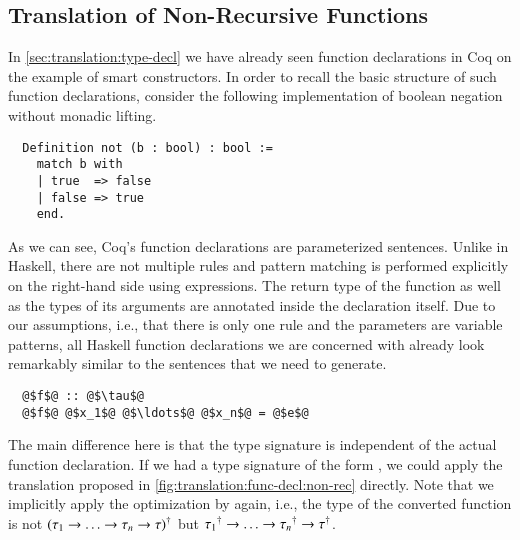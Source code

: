 \subsection{Translation of Non-Recursive Functions}
In \autoref{sec:translation:type-decl} we have already seen function declarations in Coq on the example of smart constructors.
In order to recall the basic structure of such function declarations, consider the following implementation of boolean negation without monadic lifting.
\begin{verbatim}
  Definition not (b : bool) : bool :=
    match b with
    | true  => false
    | false => true
    end.
\end{verbatim}
As we can see, Coq's function declarations are parameterized  sentences.
Unlike in Haskell, there are not multiple rules and pattern matching is performed explicitly on the right-hand side using  expressions.
The return type of the function as well as the types of its arguments are annotated inside the declaration itself.
Due to our assumptions, i.e., that there is only one rule and the parameters are variable patterns, all Haskell function declarations we are concerned with already look remarkably similar to the  sentences that we need to generate.
\begin{verbatim}
  @$f$@ :: @$\tau$@
  @$f$@ @$x_1$@ @$\ldots$@ @$x_n$@ = @$e$@
\end{verbatim}
The main difference here is that the type signature is independent of the actual function declaration.
If we had a type signature of the form , we could apply the translation proposed in \autoref{fig:translation:func-decl:non-rec} directly.
Note that we implicitly apply the optimization by \cite{Abel:2005} again, i.e.,
the type of the converted function is not ${(\tau_1 \rightarrow \ldots \rightarrow \tau_n \rightarrow \tau)}^{\dagger}$ but ${\tau_1}^{\dagger} \rightarrow \ldots \rightarrow {\tau_n}^{\dagger} \rightarrow {\tau}^{\dagger}$.

